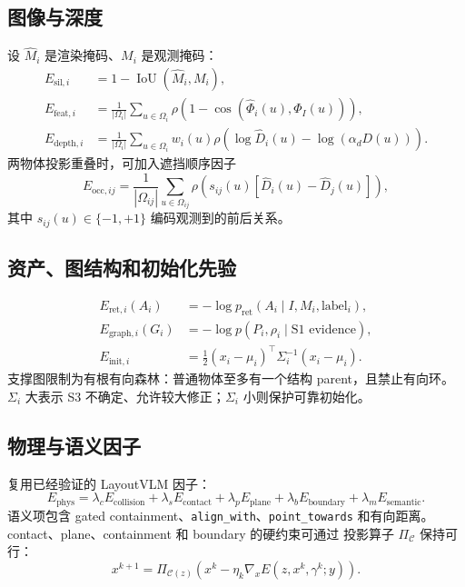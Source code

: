 \documentclass[11pt,a4paper]{ctexart}
\begin{document}
\subsection{图像与深度}
设 $\widehat M_i$ 是渲染掩码、$M_i$ 是观测掩码：
\begin{align}
 E_{\mathrm{sil},i}
 &=1-\operatorname{IoU}(\widehat M_i,M_i),\\
 E_{\mathrm{feat},i}
 &=\frac1{|\Omega_i|}\sum_{u\in\Omega_i}
 \rho\!\left(1-
 \cos(\widehat\Phi_i(u),\Phi_I(u))\right),\\
 E_{\mathrm{depth},i}
 &=\frac1{|\Omega_i|}\sum_{u\in\Omega_i}w_i(u)
 \rho\!\left(\log\widehat D_i(u)-\log(\alpha_dD(u))\right).
\end{align}
两物体投影重叠时，可加入遮挡顺序因子
\begin{equation}
 E_{\mathrm{occ},ij}
 =\frac1{|\Omega_{ij}|}\sum_{u\in\Omega_{ij}}
 \rho\!\left(s_{ij}(u)
 [\widehat D_i(u)-\widehat D_j(u)]\right),
\end{equation}
其中 $s_{ij}(u)\in\{-1,+1\}$ 编码观测到的前后关系。

\subsection{资产、图结构和初始化先验}
\begin{align}
 E_{\mathrm{ret},i}(A_i)
 &=-\log p_{\mathrm{ret}}(A_i\mid I,M_i,\text{label}_i),\\
 E_{\mathrm{graph},i}(G_i)
 &=-\log p(P_i,\rho_i\mid\text{S1 evidence}),\\
 E_{\mathrm{init},i}
 &=\frac12(x_i-\mu_i)^\top\Sigma_i^{-1}(x_i-\mu_i).
\end{align}
支撑图限制为有根有向森林：普通物体至多有一个结构 parent，且禁止有向环。
$\Sigma_i$ 大表示 S3 不确定、允许较大修正；$\Sigma_i$ 小则保护可靠初始化。

\subsection{物理与语义因子}
复用已经验证的 LayoutVLM 因子：
\begin{equation}
 E_{\mathrm{phys}}
 =\lambda_cE_{\mathrm{collision}}
 +\lambda_sE_{\mathrm{contact}}
 +\lambda_pE_{\mathrm{plane}}
 +\lambda_bE_{\mathrm{boundary}}
 +\lambda_mE_{\mathrm{semantic}}.
\end{equation}
语义项包含 gated containment、\texttt{align\_with}、\texttt{point\_towards}
和有向距离。contact、plane、containment 和 boundary 的硬约束可通过
投影算子 $\Pi_{\mathcal C}$ 保持可行：
\begin{equation}
 x^{k+1}
 =\Pi_{\mathcal C(z)}
 \left(x^k-\eta_k\nabla_xE(z,x^k,\gamma^k;y)\right).
\end{equation}
\end{document}

